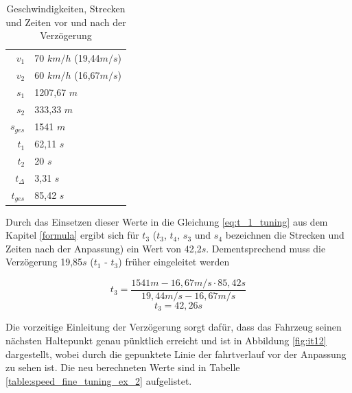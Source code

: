 \begin{table}
\begin{center}
\renewcommand{\arraystretch}{1.2}
\begin{tabular}{r L{3cm}}
$v_1$                   &   70 $km/h$ (19,44$m/s$)                         \\ 
$v_2$                   &   60 $km/h$ (16,67$m/s$)                         \\ 
$s_1$                   &   1207,67 $m$                         \\ 
$s_2$                   &   333,33 $m$                         \\ 
$s_{ges}$                   &   1541 $m$                         \\ 
$t_1$                   &   62,11 $s$                         \\ 
$t_2$                   &   20 $s$                         \\ 
$t_{\varDelta}$                   &   3,31 $s$                         \\ 
$t_{ges}$                   &   85,42 $s$                         \\ 
\end{tabular}
\renewcommand{\arraystretch}{1}
\caption{Geschwindigkeiten, Strecken und Zeiten vor und nach der Verzögerung}
\label{table:speed_fine_tuning_ex}
\end{center}
\end{table}
Durch das Einsetzen dieser Werte in die Gleichung \ref{eq:t_1_tuning} aus dem Kapitel \ref{formula} ergibt sich für $t_3$ ($t_3$, $t_4$, $s_3$ und $s_4$ bezeichnen die Strecken und Zeiten nach der Anpassung) ein Wert von 42,2$s$. Dementsprechend muss die Verzögerung 19,85$s$ ($t_1$ - $t_3$) früher eingeleitet werden
\begin{figure}
\[t_{3} = \frac{1541m - 16,67 m/s \cdot 85,42 s}{19,44 m/s - 16,67 m/s}\]
\[t_{3} = 42,26 s\]
\end{figure}
Die vorzeitige Einleitung der Verzögerung sorgt dafür, dass das Fahrzeug seinen nächsten Haltepunkt genau pünktlich erreicht und ist in Abbildung \ref{fig:it12} dargestellt, wobei durch die gepunktete Linie der \Gls{fahrtverlauf} vor der Anpassung zu sehen ist. Die neu berechneten Werte sind in Tabelle \ref{table:speed_fine_tuning_ex_2} aufgelistet.
